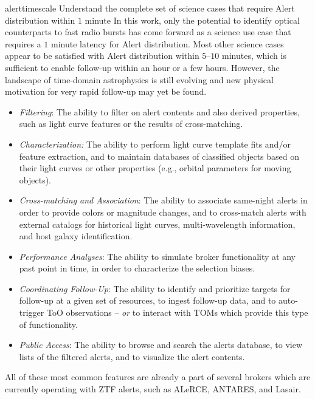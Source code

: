\nrec
{alerttimescale}
{Understand the complete set of science cases that require Alert distribution within $1$ minute}
{In this work, only the potential to identify optical counterparts to fast radio bursts has come forward as a science use case that requires a $1$ minute latency for Alert distribution. Most other science cases appear to be satisfied with Alert distribution within $5$--$10$ minutes, which is sufficient to enable follow-up within an hour or a few hours. However, the landscape of time-domain astrophysics is still evolving and new physical motivation for very rapid follow-up may yet be found.}

\medskip
{}
\begin{itemize}
\item {\it Filtering}: The ability to filter on alert contents and also derived properties, such as light curve features or the results of cross-matching.
\item {\it Characterization:} The ability to perform light curve template fits and/or feature extraction, and to maintain databases of classified objects based on their light curves or other properties (e.g., orbital parameters for moving objects).
\item {\it Cross-matching and Association}: The ability to associate same-night alerts in order to provide colors or magnitude changes, and to cross-match alerts with external catalogs for historical light curves, multi-wavelength information, and host galaxy identification.
\item {\it Performance Analyses}: The ability to simulate broker functionality at any past point in time, in order to characterize the selection biases.
\item {\it Coordinating Follow-Up}: The ability to identify and prioritize targets for follow-up at a given set of resources, to ingest follow-up data, and to auto-trigger ToO observations -- {\it or} to interact with TOMs which provide this type of functionality. 
\item {\it Public Access}: The ability to browse and search the alerts database, to view lists of the filtered alerts, and to visualize the alert contents.
\end{itemize}

All of these most common features are already a part of several brokers which are currently operating with ZTF alerts, such as ALeRCE, ANTARES, and Lasair.

